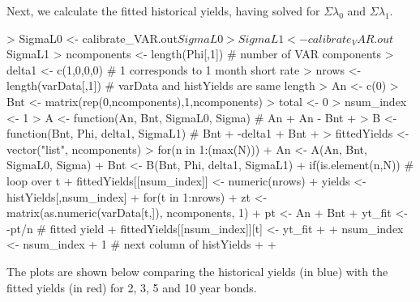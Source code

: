 \documentclass[12pt]{article}
\begin{document}
Next, we calculate the fitted historical yields, having solved for $\Sigma\lambda_0$
and $\Sigma\lambda_1$. 

\begin{Schunk}
\begin{Sinput}
> SigmaL0 <- calibrate_VAR.out$SigmaL0
> SigmaL1 <- calibrate_VAR.out$SigmaL1 
> ncomponents <- length(Phi[,1]) # number of VAR components
> delta1 <- c(1,0,0,0) # 1 corresponds to 1 month short rate
> nrows <- length(varData[,1]) # varData and histYields are same length
> An <- c(0)
> Bnt <- matrix(rep(0,ncomponents),1,ncomponents)
> total <- 0
> nsum_index <- 1
> A <- function(An, Bnt, SigmaL0, Sigma) { # An
+   An - Bnt %
+ }
> B <- function(Bnt, Phi, delta1, SigmaL1) { # Bnt
+   -delta1 + Bnt %
+ }
> fittedYields <- vector("list", ncomponents)
> for(n in 1:(max(N))) {
+   An <- A(An, Bnt, SigmaL0, Sigma)
+   Bnt <- B(Bnt, Phi, delta1, SigmaL1)
+   if(is.element(n,N)) { # loop over t
+     fittedYields[[nsum_index]] <- numeric(nrows)
+     yields <- histYields[,nsum_index]
+     for(t in 1:nrows) {
+       zt <- matrix(as.numeric(varData[t,]), ncomponents, 1)
+       pt <- An + Bnt %
+       yt_fit <- -pt/n # fitted yield
+       fittedYields[[nsum_index]][t] <- yt_fit
+     }
+     nsum_index <- nsum_index + 1 # next column of histYields
+   }
+ }
\end{Sinput}
\end{Schunk}

The plots are shown below comparing the historical yields (in blue)
with the fitted yields (in red) for 2, 3, 5 and 10 year bonds.
\end{document}

